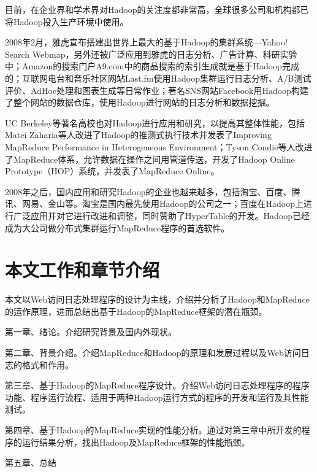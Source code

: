 目前，在企业界和学术界对Hadoop的关注度都非常高，全球很多公司和机构都已将Hadoop投入生产环境中使用。

2008年2月，雅虎宣布搭建出世界上最大的基于Hadoop的集群系统—Yahoo! Search Webmap\cite{site:Yahoo}，另外还被广泛应用到雅虎的日志分析、广告计算、科研实验中；Amazon的搜索门户A9.com中的商品搜索的索引生成就是基于Hadoop完成的；互联网电台和音乐社区网站Last.fm使用Hadoop集群运行日志分析、A/B测试评价、AdHoc处理和图表生成等日常作业；著名SNS网站Facebook用Hadoop构建了整个网站的数据仓库，使用Hadoop进行网站的日志分析和数据挖掘。

UC Berkeley等著名高校也对Hadoop进行应用和研究，以提高其整体性能，包括Matei Zaharia等人改进了Hadoop的推测式执行技术并发表了Improving MapReduce Performance in Heterogeneous Environment\cite{paper:Hadoop-Performance-in-Heterogeneous}；Tyson Condie等人改进了MapReduce体系，允许数据在操作之间用管道传送，开发了Hadoop Online Prototype（HOP）系统，并发表了MapReduce Online。

2008年之后，国内应用和研究Hadoop的企业也越来越多，包括淘宝、百度、腾讯、网易、金山等。淘宝是国内最先使用Hadoop的公司之一；百度在Hadoop上进行广泛应用并对它进行改进和调整，同时赞助了HyperTable的开发。Hadoop已经成为大公司做分布式集群运行MapReduce程序的首选软件。

\section{本文工作和章节介绍}
本文以Web访问日志处理程序的设计为主线，介绍并分析了Hadoop和MapReduce的运作原理，进而总结出基于Hadoop的MapReduce框架的潜在瓶颈。

第一章、绪论。介绍研究背景及国内外现状。

第二章、背景介绍。介绍MapReduce和Hadoop的原理和发展过程以及Web访问日志的格式和作用。

第三章、基于Hadoop的MapReduce程序设计。介绍Web访问日志处理程序的程序功能、程序运行流程、适用于两种Hadoop运行方式的程序的开发和运行及其性能测试。

第四章、基于Hadoop的MapReduce实现的性能分析。通过对第三章中所开发的程序的运行结果分析，找出Hadoop及MapReduce框架的性能瓶颈。

第五章、总结